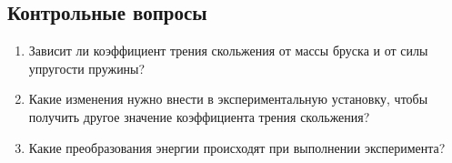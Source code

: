 \documentclass[a4paper, 12pt]{extarticle}
\begin{document}
\subsection{Контрольные вопросы}
\begin{enumerate}
\item Зависит ли коэффициент трения скольжения от массы бруска и от силы упругости пружины?
\item Какие изменения нужно внести в экспериментальную установку, чтобы получить другое значение коэффициента трения скольжения?
\item Какие преобразования энергии происходят при выполнении эксперимента?
\end{enumerate}
\end{document}
